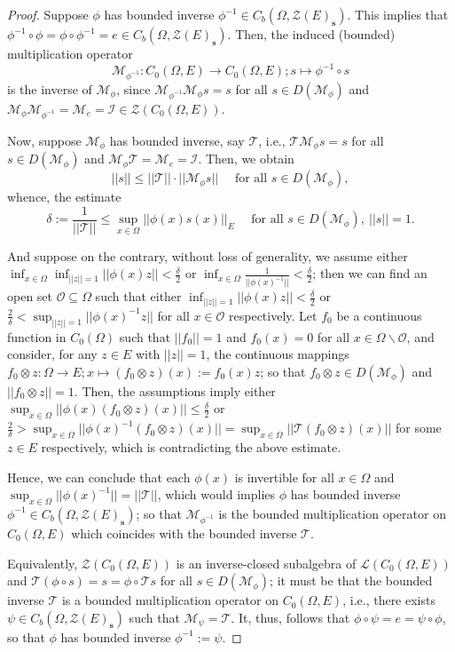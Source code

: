 \documentclass[10pt,a4paper]{amsart}
\newcommand{\Bm}[1]{ \boldsymbol{ #1 }}
\newcommand{\Om}{\Omega}
\newcommand{\bk}{\backslash}
\newcommand{\cc}{\circ}
\newcommand{\cd}{\cdot}
\newcommand{\de}{\delta}
\newcommand{\lo}{\longrightarrow}
\newcommand{\mI}{\mathcal{I}}
\newcommand{\mM}{\mathcal{M}}
\newcommand{\mO}{\mathcal{O}}
\newcommand{\mT}{\mathcal{T}}
\newcommand{\mZ}{\mathcal{Z}}
\newcommand{\mt}{\mapsto}
\newcommand{\q}{\quad}
\newcommand{\sL}{\mathscr{L}}
\newcommand{\sse}{\subseteq}
\begin{document}
\begin{proof}
	

	\item[(iii)] Suppose $\phi$ has bounded inverse $\phi^{-1}\in C_b(\Om, \Bm{\mZ}(E)_\textbf{s})$. This implies that $\phi^{-1}\cc\phi =\phi\cc\phi^{-1} =e \in C_b(\Om, \Bm{\mZ}(E)_\textbf{s})$.  Then, the induced (bounded) multiplication operator $$\mM_{\phi^{-1}} : C_0(\Om, E) \lo C_0(\Om, E) ; s \mt \phi^{-1}\cc s$$ is the inverse of $\mM_\phi$, since  $\mM_{\phi^{-1}}\mM_\phi s = s$ for all $s\in D(\mM_\phi)$ and	
	$   \mM_\phi \mM_{\phi^{-1}} = \mM_e = \mI\in \Bm{\mZ} ( C_0(\Om, E))$. \bigskip
	
		
	Now, suppose $\mM_\phi$ has bounded inverse, say $\mT$, i.e., $\mT\mM_\phi s = s$ for all $s\in D(\mM_\phi)$ and $\mM_\phi\mT = \mM_e = \mI$. Then, we obtain
\[||s|| \le ||\mT|| \cd ||\mM_\phi s|| \q \text{ for all } s\in D(\mM_\phi),\]
	whence, the estimate
\[\de:= \frac{1}{||\mT||}\le \sup_{x\in\Om}||\phi(x)s(x)||_E \q \text{ for all } s\in D(\mM_\phi), \ ||s||=1.\]
	
	And suppose on the contrary, without loss of generality, we assume either $\inf_{x\in\Om}\inf_{||z||=1}||\phi(x)z||	<\frac{\de}{2}$ or $\inf_{x\in\Om} \frac{1}{||\phi(x)^{-1}||}<\frac{\de}{2}$; then we can find an open set $\mO \sse \Om$ such that either $\inf_{||z||=1}||\phi(x)z||<\frac{\de}{2}$ or $\frac{2}{\de}<\sup_{||z||=1}||\phi(x)^{-1}z||$ for all $x\in\mO$ respectively. Let $f_0$ be a continuous function in $C_0(\Om)$ such that $||f_0||=1$ and  $f_0(x)=0$ for all $x\in\Om\bk\mO$, and consider, for any $z\in E$ with $||z||=1$, the continuous mappings $f_0\otimes z : \Om \lo E ; x \mt (f_0\otimes z)(x):= f_0(x)z$; so that $f_0\otimes z \in D(\mM_\phi)$ and $||f_0\otimes z||=1$. Then, the assumptions imply either $\sup_{x\in\Om} ||\phi(x)(f_0\otimes z)(x)||\le\frac{\de}{2}$ or $\frac{2}{\de} >\sup_{x\in\Om}||\phi(x)^{-1}(f_0\otimes z)(x) ||   =\sup_{x\in\Om}||\mT(f_0\otimes z)(x)||  $ for some $z\in E$ respectively, which is contradicting the above estimate. 
	
	
	Hence, we can conclude that each $\phi(x)$ is invertible for all $x\in\Om$ and $\sup_{x\in\Om}||\phi(x)^{-1}||= ||\mT || $, which would implies $\phi$ has bounded inverse $\phi^{-1}\in C_b(\Om, \Bm{\mZ}(E)_\textbf{s})$; so that $\mM_{\phi^{-1}}$ is the bounded multiplication operator on  $C_0(\Om, E)$ which coincides with the bounded inverse $\mT$.	
	
	Equivalently, $\Bm{\mZ} ( C_0(\Om, E))$ is an inverse-closed subalgebra of  $\sL( C_0(\Om, E)) $ and $ \mT(\phi \cc s) = s = \phi \cc \mT s$ for all $s\in D(\mM_\phi)$; it must be that the bounded inverse $\mT$ is a bounded multiplication operator on  $C_0(\Om, E)$, i.e., there exists $\psi\in C_b(\Om, \Bm{\mZ}(E)_\textbf{s})$ such that $\mM_\psi = \mT$. 	It, thus, follows that $\phi \cc \psi = e=\psi \cc\phi $, so that $\phi$ has bounded inverse $\phi^{-1}:=\psi$.
	

\end{proof}
\end{document}
